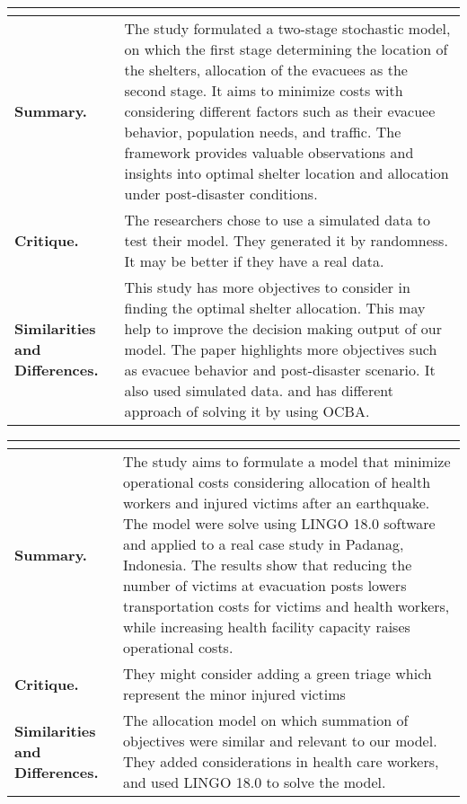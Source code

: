 \begin{longtable}{|L{.2\linewidth}|L{.74\linewidth}|}
	\hline
	\\ \hline
	\textbf{Summary.} & The study formulated a two-stage stochastic model, on which the first stage determining the location of the shelters, allocation of the evacuees as the second stage. It aims to minimize costs with considering different factors such as their evacuee behavior, population needs, and traffic. The framework provides valuable observations and insights into optimal shelter location and allocation under post-disaster conditions. \\ \hline
	\textbf{Critique.} & The researchers chose to use a simulated data to test their model. They generated it by randomness. It may be better if they have a real data. \\ \hline
	\textbf{Similarities and Differences.} & This study has more objectives to consider in finding the optimal shelter allocation. This may help to improve the decision making output of our model.	The paper highlights more objectives such as evacuee behavior and post-disaster scenario. It also used simulated data. and has different approach of solving it by using OCBA.  \\ \hline
\end{longtable}

\begin{longtable}{|L{.2\linewidth}|L{.74\linewidth}|}
	\hline
	\\ \hline
	\textbf{Summary.} & The study aims to formulate a model that minimize operational costs considering allocation of health workers and injured victims after an earthquake. The model were solve using LINGO 18.0 software and applied to a real case study in Padanag, Indonesia. The results show that reducing the number of victims at evacuation posts lowers transportation costs for victims and health workers, while increasing health facility capacity raises operational costs. \\ \hline
	\textbf{Critique.} & They might consider adding a green triage which represent the minor injured victims \\ \hline
	\textbf{Similarities and Differences.} & The allocation model on which summation of objectives were similar and relevant to our model.	They added considerations in health care workers, and used LINGO 18.0 to solve the model.  \\ \hline
\end{longtable}


